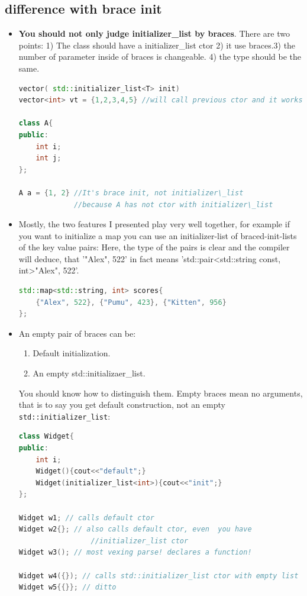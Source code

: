 \documentclass[a4paper,11pt,twoside]{book}
\begin{document}
\subsection{difference with brace init}
\begin{itemize}
	\item  \textbf{You should not only judge initializer\_list by braces}. There are two points: 1) The class should have a initializer\_list ctor 2) it use braces.3) the number of parameter inside of braces is changeable. 4) the type should be the same.
\begin{lstlisting}[frame=single, language=c++,mathescape=true]
vector( std::initializer_list<T> init)
vector<int> vt = {1,2,3,4,5} //will call previous ctor and it works. 
	
class A{
public:
	int i;
	int j;
};
	
A a = {1, 2} //It's brace init, not initializer\_list
             //because A has not ctor with initializer\_list
\end{lstlisting}
	
	\item Mostly, the two features I presented play very well together, for example if you want to initialize a map you can use an initializer-list of braced-init-lists of the key value pairs: Here, the type of the pairs is clear and the compiler will deduce, that '{"Alex", 522}' in fact means 'std::pair<std::string const, int>{"Alex", 522}'.
	
\begin{lstlisting}[frame=single, language=c++,mathescape=true]
std::map<std::string, int> scores{ 
	{"Alex", 522}, {"Pumu", 423}, {"Kitten", 956} 
};
\end{lstlisting}
	
	\item An empty pair of braces can be:
	\begin{enumerate}
		\item Default initialization.
		\item An empty std::initializaer\_list.
	\end{enumerate}
	You should know how to distinguish them.  Empty braces mean no arguments, that is to say you get default construction, not an empty \texttt{std::initializer\_list}:
\begin{lstlisting}[frame=single, language=c++,mathescape=true]
class Widget{
public:
	int i;
	Widget(){cout<<"default";}
	Widget(initializer_list<int>){cout<<"init";}
};
	
Widget w1; // calls default ctor
Widget w2{}; // also calls default ctor, even  you have 
	             //initializer_list ctor
Widget w3(); // most vexing parse! declares a function!
	
Widget w4({}); // calls std::initializer_list ctor with empty list
Widget w5{{}}; // ditto
\end{lstlisting}
	
	\end{itemize}
	
\end{document}
